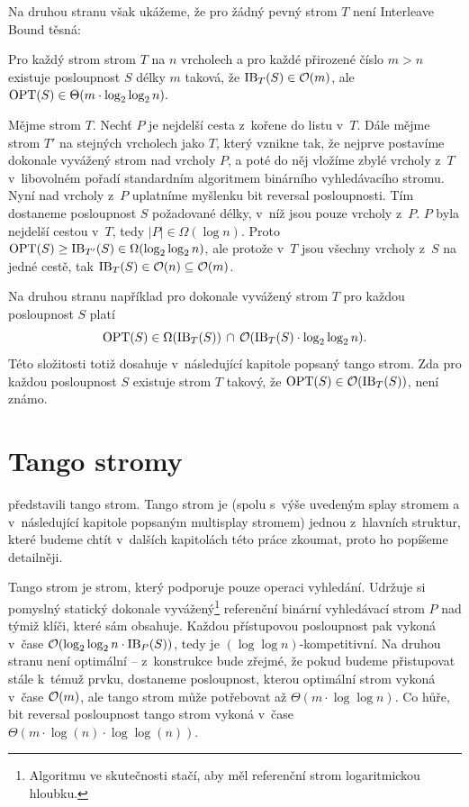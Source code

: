 Na druhou stranu však ukážeme, že pro žádný pevný strom $T$ není Interleave Bound těsná:
\begin{tvrz}
Pro každý strom strom $T$ na $n$ vrcholech a pro každé přirozené číslo $m>n$ existuje posloupnost $S$ délky $m$ taková, že $\operatorname{IB}_T(S) \in \mathcal O(m)$, ale $\opt(S) \in \Theta(m\cdot\log\log n).$ 
\end{tvrz}

\begin{dukaz}
Mějme strom $T$. Nechť $P$ je nejdelší cesta z~kořene do listu v~$T$. Dále
mějme strom $T'$ na stejných vrcholech jako $T$, který vznikne tak, že nejprve
postavíme dokonale vyvážený strom nad vrcholy $P$, a poté do něj vložíme zbylé
vrcholy z~$T$ v~libovolném pořadí standardním algoritmem binárního
vyhledávacího stromu. Nyní nad vrcholy z~$P$ uplatníme myšlenku bit reversal
posloupnosti. Tím dostaneme posloupnost $S$ požadované délky, v~níž jsou pouze
vrcholy z~$P$. $P$ byla nejdelší cestou v~$T$, tedy $|P|\in \Omega(\log n)$.
Proto $\opt(S)\geq \ib_{T'}(S) \in \Omega (\log\log n)$, ale protože v~$T$ jsou
všechny vrcholy z~$S$ na jedné cestě, tak $\operatorname{IB}_T(S) \in \mathcal O(n) \subseteq \mathcal O(m)$.
\end{dukaz}

Na druhou stranu například pro dokonale vyvážený strom $T$ pro každou
posloupnost $S$ platí $$\opt(S) \in \Omega(\ib_T(S))\, \cap\,
\o(\ib_T(S)\cdot\log\log n).$$ Této složitosti totiž dosahuje v~následující
kapitole popsaný tango strom.  Zda pro každou posloupnost $S$ existuje
strom $T$ takový, že $\operatorname{OPT}(S)\in\mathcal O(\operatorname{IB}_T(S))$, není známo.  

\section{Tango stromy}\label{sec:tango}

\citet{tango} představili tango strom. Tango strom je (spolu s~výše uvedeným
splay stromem a v~následující kapitole popsaným multisplay stromem) jednou
z~hlavních struktur, které budeme chtít v~dalších kapitolách této práce zkoumat,
proto ho popíšeme detailněji.

Tango strom je strom, který podporuje pouze operaci vyhledání. Udržuje si
pomyslný statický dokonale vyvážený\footnote{Algoritmu ve skutečnosti stačí,
aby měl referenční strom logaritmickou hloubku.} referenční binární vyhledávací
strom $P$ nad týmiž klíči, které sám obsahuje. Každou přístupovou
posloupnost pak vykoná v~čase $\o(\log\log n\cdot \ib_P(S))$, tedy je
$(\log\log n)$-kompetitivní. Na druhou stranu není optimální -- z~konstrukce
bude zřejmé, že pokud budeme přistupovat stále k~témuž prvku, dostaneme posloupnost, kterou optimální strom
 vykoná v~čase $\mathcal O(m)$, ale tango strom může potřebovat až
$\Theta(m\cdot\log\log n )$. Co hůře, bit reversal posloupnost tango strom vykoná v~čase $\Theta(m\cdot\log(n)\cdot \log\log(n))$.

